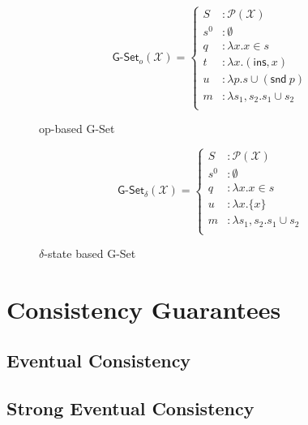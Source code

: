 \begin{figure}[H]
  \centering
  \[
    \textsf{G-Set}_o(\mathcal{X}) = \left\{\begin{aligned}
      S &: \mathcal{P}(\mathcal{X}) \\
      s^0 &: \emptyset \\
      q &: \lambda x. x \in s \\
      t &: \lambda x. (\textsf{ins}, x) \\
      u &: \lambda p. s \cup (\textsf{snd}~p) \\
      m &: \lambda s_1, s_2. s_1 \cup s_2 \\
    \end{aligned}\right.
  \]
  \caption{op-based \textsf{G-Set} \CRDT}
\end{figure}

\begin{figure}[H]
  \centering
  \[
    \textsf{G-Set}_\delta(\mathcal{X}) = \left\{\begin{aligned}
      S &: \mathcal{P}(\mathcal{X}) \\
      s^0 &: \emptyset \\
      q &: \lambda x. x \in s \\
      u &: \lambda x. \{ x \} \\
      m &: \lambda s_1, s_2. s_1 \cup s_2 \\
    \end{aligned}\right.
  \]
  \caption{$\delta$-state based \textsf{G-Set} \CRDT}
\end{figure}

\section{Consistency Guarantees}
\subsection{Eventual Consistency}
\subsection{Strong Eventual Consistency}
